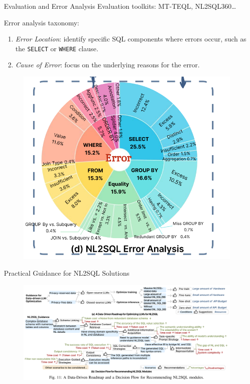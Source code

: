 \documentclass[aspectratio=169,xcolor=dvipsnames]{beamer}
\begin{document}
\begin{frame}{Evaluation and Error Analysis}
    Evaluation toolkits: MT-TEQL, NL2SQL360\dots

    Error analysis taxonomy:
    \begin{enumerate}
        \item \textit{Error Location}: identify specific SQL components where errors occur, such as the \texttt{SELECT} or \texttt{WHERE} clause.
        \item \textit{Cause of Error}: focus on the underlying reasons for the error.
    \end{enumerate}
    \begin{figure}
        \includegraphics[width=.35\linewidth]{assets/error.png}
    \end{figure}
\end{frame}


\begin{frame}{Practical Guidance for NL2SQL Solutions}
    \begin{figure}
        \includegraphics[width=\linewidth]{assets/roadmap.png}
    \end{figure}
\end{frame}

\end{document}

